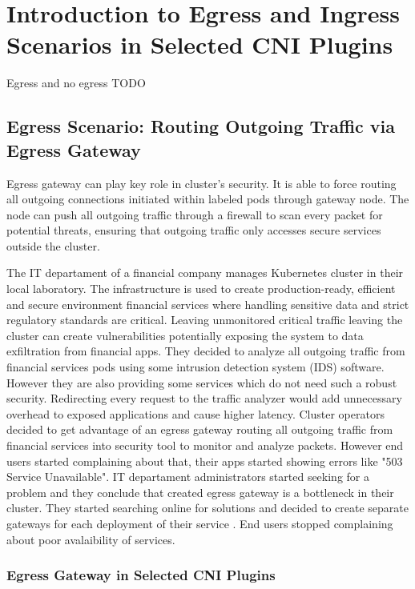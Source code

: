 \chapter{Introduction to Egress and Ingress Scenarios in Selected CNI Plugins}
\label{cha:introScenarios}
Egress and no egress TODO

\section{Egress Scenario: Routing Outgoing Traffic via Egress Gateway}
\label{sec:egress}

Egress gateway can play key role in cluster's security. It is able to force routing all outgoing connections initiated within labeled pods through gateway node. The node can push all outgoing traffic through a firewall to scan every packet for potential threats, ensuring that outgoing traffic only accesses secure services outside the cluster.

The IT departament of a financial company manages Kubernetes cluster in their local laboratory. The infrastructure is used to create production-ready, efficient and secure environment financial services where handling sensitive data and strict regulatory standards are critical. Leaving unmonitored critical traffic leaving the cluster can create vulnerabilities potentially exposing the system to data exfiltration from financial apps. They decided to analyze all outgoing traffic from financial services pods using some intrusion detection system (IDS) software. However they are also providing some services which do not need such a robust security. Redirecting every request to the traffic analyzer would add unnecessary overhead to exposed applications and cause higher latency. Cluster operators decided to get advantage of an egress gateway routing all outgoing traffic from financial services into security tool to monitor and analyze packets. However end users started complaining about that, their apps started showing errors like "503 Service Unavailable". IT departament administrators started seeking for a problem and they conclude that created egress gateway is a bottleneck in their cluster. They started searching online for solutions and decided to create separate gateways for each deployment of their service \cite{CalicoEgressDeploy}. End users stopped complaining about poor avalaibility of services.

\subsection{Egress Gateway in Selected CNI Plugins}
\label{subsection:egressGateway}

